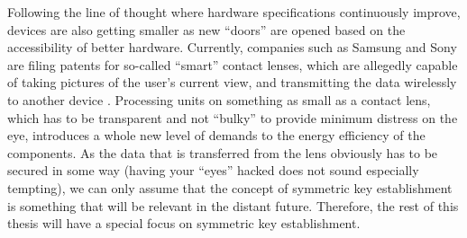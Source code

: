 


Following the line of thought where hardware specifications continuously improve, devices are also getting smaller as new ``doors'' are opened based on the accessibility of better hardware. Currently, companies such as Samsung and Sony are filing patents for so-called ``smart'' contact lenses, which are allegedly capable of taking pictures of the user's current view, and transmitting the data wirelessly to another device \cite{sony-lens, samsung-lens}. Processing units on something as small as a contact lens, which has to be transparent and not ``bulky'' to provide minimum distress on the eye, introduces a whole new level of demands to the energy efficiency of the components. As the data that is transferred from the lens obviously has to be secured in some way (having your ``eyes'' hacked does not sound especially tempting), we can only assume that the concept of symmetric key establishment is something that will be relevant in the distant future. Therefore, the rest of this thesis will have a special focus on symmetric key establishment.




